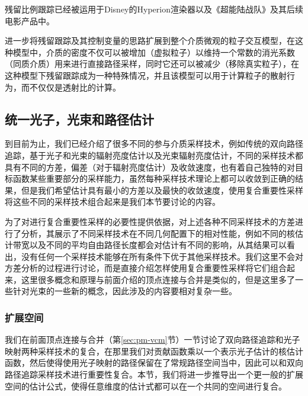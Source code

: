 残留比例跟踪已经被运用于Disney的Hyperion渲染器\cite{a:ResidualRatioTrackingforEstimatingAttenuationinParticipatingMedia}以及《超能陆战队》\cite{a:BigHero6:IntothePortal}及其后续电影产品中。

\cite{a:UnbiasedLightTransportEstimatorsforInhomogeneousParticipatingMedia}进一步将残留跟踪及其控制变量的思路扩展到整个介质微观的粒子交互模型，在这种模型中，介质的密度不仅可以被增加（虚拟粒子）以维持一个常数的消光系数（同质介质）用来进行直接路径采样，同时它还可以被减少（移除真实粒子），在这种模型下残留跟踪成为一种特殊情况，并且该模型可以用于计算粒子的散射行为，而不仅仅是透射比的计算。





\subsection{统一光子，光束和路径估计}\label{sec:pm-upbp}
到目前为止，我们已经介绍了很多不同的参与介质采样技术，例如传统的双向路径追踪，基于光子和光束的辐射亮度估计以及光束辐射亮度估计，不同的采样技术都具有不同的方差，偏差（对于辐射亮度估计）及收敛速度，也有着自己独特的对目标函数某些重要部分的采样能力，虽然每种采样技术理论上都可以收敛到正确的结果，但是我们希望估计具有最小的方差以及最快的收敛速度，使用复合重要性采样将这些不同的采样技术组合起来是我们本节要讨论的内容。

为了对进行复合重要性采样的必要性提供依据，\cite{a:UnifyingPointsBeamsandPathsinVolumetricLightTransportSimulation}对上述各种不同采样技术的方差进行了分析，其展示了不同采样技术在不同几何配置下的相对性能，例如不同的核估计带宽以及不同的平均自由路径长度都会对估计有不同的影响，从其结果可以看出，没有任何一个采样技术能够在所有条件下优于其他采样技术。我们这里不会对方差分析的过程进行讨论，而是直接介绍怎样使用复合重要性采样将它们组合起来，这里很多概念和原理与前面介绍的顶点连接与合并是类似的，但是这里多了一些针对光束的一些新的概念，因此涉及的内容要相对复杂一些。




\subsubsection{扩展空间}
我们在前面顶点连接与合并（第\ref{sec:pm-vcm}节）一节讨论了双向路径追踪和光子映射两种采样技术的复合，在那里我们对贡献函数乘以一个表示光子估计的核估计函数，然后使得使用光子映射的路径保留在了常规路径空间当中，因此可以和双向路径追踪采样技术进行重要性复合。本节，我们将进一步推导出一个更一般的扩展空间的估计公式，使得任意维度的估计式都可以在一个共同的空间进行复合。

